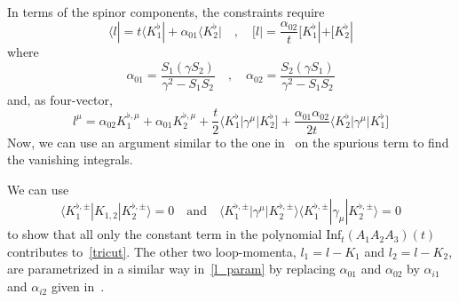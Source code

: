 In terms of the spinor components, the constraints require
\begin{equation}\label{l_param}
\langle l | = t\langle K_1^\flat| + \alpha_{01}\langle K_2^\flat| 
\quad,\quad
[ l | = \frac{\alpha_{02}}{t}[ K_1^\flat| + [ K_2^\flat|
\end{equation}
where
\begin{equation}
\alpha_{01} = \frac{S_1(\gamma S_2)}{\gamma^2 - S_1S_2}\quad,\quad
\alpha_{02} = \frac{S_2(\gamma S_1)}{\gamma^2 - S_1S_2}
\end{equation}
%
and, as four-vector,
\begin{equation}
l^\mu = \alpha_{02} K_1^{\flat,\mu} + \alpha_{01}K_2^{\flat,\mu} + \frac{t}{2}\langle K_1^\flat | \gamma^\mu |K_2^\flat] + \frac{\alpha_{01}\alpha_{02}}{2t}\langle K_2^\flat|\gamma^\mu |K_1^\flat]
\end{equation}
%
Now, we can use an argument similar to the one in~\cite{Ossola:2006us} on the spurious term to find the vanishing integrals.
%
\iffalse
To illustrate this argument, we consider the case of a rank-1 3-point-like integral. 
By simple arguments on the rank and the dependence on external momenta, 
\begin{equation}
\int\dd^D q \frac{q^\mu}{D_0(q)D_1(q+p_1)D_2(q+p_2)} = c_1p_1^\mu + c_2p_2^\mu
\end{equation}
If we contract the above relation with a vector $v^\mu$ orthogonal to $p_1$ and $p_2$, we obtain a vanishing integral.
$q\cdot v$ is hence a spurious term.
The same technique can be applied to show that $(q\cdot v)^n$ is spurious for any $n>0$. 
\fi
%
We can use 
\begin{equation}
\langle K_1^{\flat,\pm} | K_{1,2}|K_2^{\flat,\pm}\rangle = 0 
\quad\mathrm{and}\quad
\langle K_1^{\flat,\pm}|\gamma^\mu|K_{2}^{\flat,\pm}\rangle\langle K_1^{\flat,\pm}|\gamma_\mu|K_{2}^{\flat,\pm}\rangle = 0
\end{equation}
to show that all only the constant term in the polynomial $\mathrm{Inf}_t(A_1A_2A_3)(t)$ contributes to~\cref{tricut}. 
The other two loop-momenta, $l_1 = l-K_1$ and $l_2 = l-K_2$, are parametrized in a similar way in~\cref{l_param} by replacing $\alpha_{01}$ and $\alpha_{02}$ by $\alpha_{i1}$ and $\alpha_{i2}$ given in~\cite{Forde:2007mi}.
%
%
